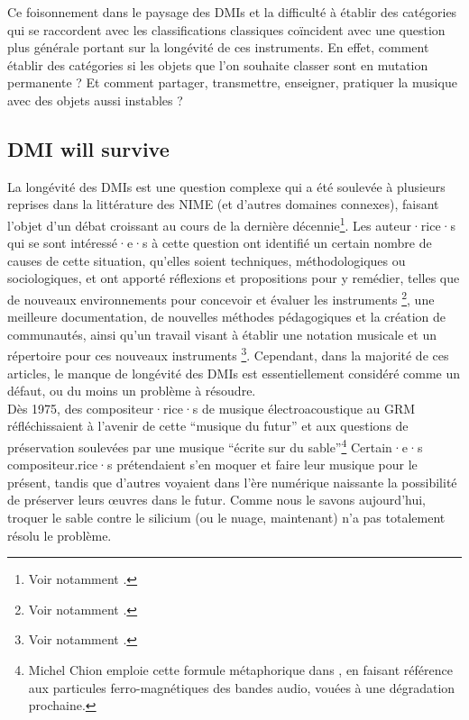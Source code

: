 \noindent Ce foisonnement dans le paysage des \glspl{DMI} et la difficulté à établir des catégories qui se raccordent avec les classifications classiques coïncident avec une question plus générale portant sur la longévité de ces instruments. En effet, comment établir des catégories si les objets que l'on souhaite classer sont en mutation permanente ? Et comment partager, transmettre, enseigner, pratiquer la musique avec des objets aussi instables ?

\subsection{DMI will survive}

\noindent La longévité des \glspl{DMI} est une question complexe qui a été soulevée à plusieurs reprises dans la littérature des \gls{NIME} (et d'autres domaines connexes), faisant l'objet d'un débat croissant au cours de la dernière décennie\footnote{Voir notamment \cite{baguyos_contemporary_2014, morreale_design_2017,bonardi_preservation_2008}.}. Les auteur·rice·s qui se sont intéressé·e·s à cette question ont identifié un certain nombre de causes de cette situation, qu'elles soient techniques, méthodologiques ou sociologiques, et ont apporté réflexions et propositions pour y remédier, telles que de nouveaux environnements pour concevoir et évaluer les instruments \footnote{Voir notamment \cite{jorda_digital_2004, morreale_design_2017}.}, une meilleure documentation, de nouvelles méthodes pédagogiques et la création de communautés, ainsi qu'un travail visant à établir une notation musicale et un répertoire pour ces nouveaux instruments \footnote{Voir notamment \cite{mamedes_composing_2014,mays_notation_2014}.}. Cependant, dans la majorité de ces articles, le manque de longévité des \glspl{DMI} est essentiellement considéré comme un défaut, ou du moins un problème à résoudre.\\
\indent Dès 1975, des compositeur·rice·s de musique électroacoustique au \gls{GRM} réfléchissaient à l'avenir de cette ``musique du futur'' et aux questions de préservation soulevées par une musique ``écrite sur du sable''\footnote{Michel Chion emploie cette formule métaphorique dans \cite{chion_musique_1977}, en faisant référence aux particules ferro-magnétiques des bandes audio, vouées à une dégradation prochaine.} Certain·e·s compositeur.rice·s prétendaient s'en moquer et faire leur musique pour le présent, tandis que d'autres voyaient dans l'ère numérique naissante la possibilité de préserver leurs œuvres dans le futur. Comme nous le savons aujourd'hui, troquer le sable contre le silicium (ou le nuage, maintenant) n'a pas totalement résolu le problème.\\

